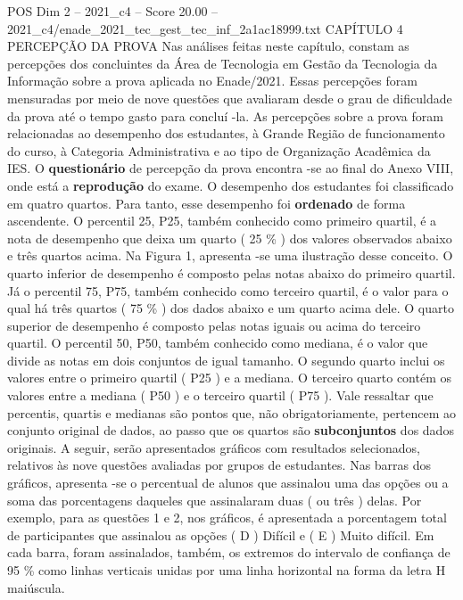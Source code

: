\begin{textsample}{POS Dim 2 – 2021\_c4 – Score 20.00 – 2021\_c4/enade\_2021\_tec\_gest\_tec\_inf\_2a1ac18999.txt}  \label{ex:f2_pos_033}
CAPÍTULO 4 PERCEPÇÃO DA PROVA Nas análises feitas neste capítulo, constam as percepções dos concluintes da Área de Tecnologia em Gestão da Tecnologia da Informação sobre a prova aplicada no Enade/2021.
Essas percepções foram mensuradas por meio de nove questões que avaliaram desde o grau de dificuldade da prova até o tempo gasto para concluí -la.
As percepções sobre a prova foram relacionadas ao desempenho dos estudantes, à Grande Região de funcionamento do curso, à Categoria Administrativa e ao tipo de Organização Acadêmica da IES.
O \textbf{questionário} de percepção da prova encontra -se ao final do Anexo VIII, onde está a \textbf{reprodução} do exame.
O desempenho dos estudantes foi classificado em quatro quartos.
Para tanto, esse desempenho foi \textbf{ordenado} de forma ascendente.
O percentil 25, P25, também conhecido como primeiro quartil, é a nota de desempenho que deixa um quarto ( 25 \% ) dos valores observados abaixo e três quartos acima.
Na Figura 1, apresenta -se uma ilustração desse conceito.
O quarto inferior de desempenho é composto pelas notas abaixo do primeiro quartil.
Já o percentil 75, P75, também conhecido como terceiro quartil, é o valor para o qual há três quartos ( 75 \% ) dos dados abaixo e um quarto acima dele.
O quarto superior de desempenho é composto pelas notas iguais ou acima do terceiro quartil.
O percentil 50, P50, também conhecido como mediana, é o valor que divide as notas em dois conjuntos de igual tamanho.
O segundo quarto inclui os valores entre o primeiro quartil ( P25 ) e a mediana.
O terceiro quarto contém os valores entre a mediana ( P50 ) e o terceiro quartil ( P75 ).
Vale ressaltar que percentis, quartis e medianas são pontos que, não obrigatoriamente, pertencem ao conjunto original de dados, ao passo que os quartos são \textbf{subconjuntos} dos dados originais.
A seguir, serão apresentados gráficos com resultados selecionados, relativos às nove questões avaliadas por grupos de estudantes.
Nas barras dos gráficos, apresenta -se o percentual de alunos que assinalou uma das opções ou a soma das porcentagens daqueles que assinalaram duas ( ou três ) delas.
Por exemplo, para as questões 1 e 2, nos gráficos, é apresentada a porcentagem total de participantes que assinalou as opções ( D ) Difícil e ( E ) Muito difícil.
Em cada barra, foram assinalados, também, os extremos do intervalo de confiança de 95 \% como linhas verticais unidas por uma linha horizontal na forma da letra H maiúscula.

\end{textsample}
